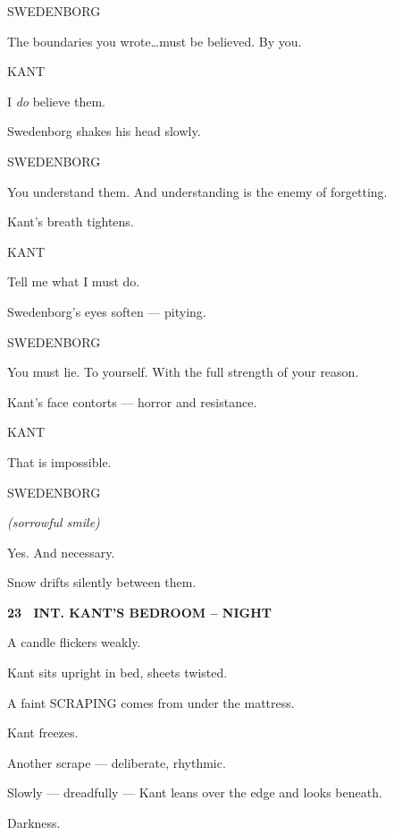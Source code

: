 \documentclass[12pt]{article}
\newcommand{\scene}[2]{%
  \vspace{1.8\baselineskip}%
  \noindent\textbf{#1 \ #2}\par\vspace{0.4\baselineskip}%
}
\newenvironment{dialogue}[1]{%
  \vspace{0.8\baselineskip}%
  \noindent\hspace*{2.3in}\textsc{#1}\par%
  \noindent\hspace*{1.5in}\begin{minipage}[t]{4.5in}%
}{%
  \end{minipage}\par%
}
\newcommand{\paren}[1]{%
  \noindent\hspace*{1.8in}\textit{(#1)}\par%
}
\begin{document}
\begin{dialogue}{SWEDENBORG}
The boundaries you wrote\ldots must be believed. By you.
\end{dialogue}

\begin{dialogue}{KANT}
I \emph{do} believe them.
\end{dialogue}

Swedenborg shakes his head slowly.

\begin{dialogue}{SWEDENBORG}
You understand them. And understanding is the enemy of forgetting.
\end{dialogue}

Kant’s breath tightens.

\begin{dialogue}{KANT}
Tell me what I must do.
\end{dialogue}

Swedenborg’s eyes soften — pitying.

\begin{dialogue}{SWEDENBORG}
You must lie. To yourself. With the full strength of your reason.
\end{dialogue}

Kant’s face contorts — horror and resistance.

\begin{dialogue}{KANT}
That is impossible.
\end{dialogue}

\begin{dialogue}{SWEDENBORG}
\paren{sorrowful smile}
Yes. And necessary.
\end{dialogue}

Snow drifts silently between them.


\scene{23}{INT. KANT'S BEDROOM -- NIGHT}

A candle flickers weakly.

Kant sits upright in bed, sheets twisted.

A faint SCRAPING comes from under the mattress.

Kant freezes.

Another scrape — deliberate, rhythmic.

Slowly — dreadfully — Kant leans over the edge and looks beneath.

Darkness.
\end{document}
